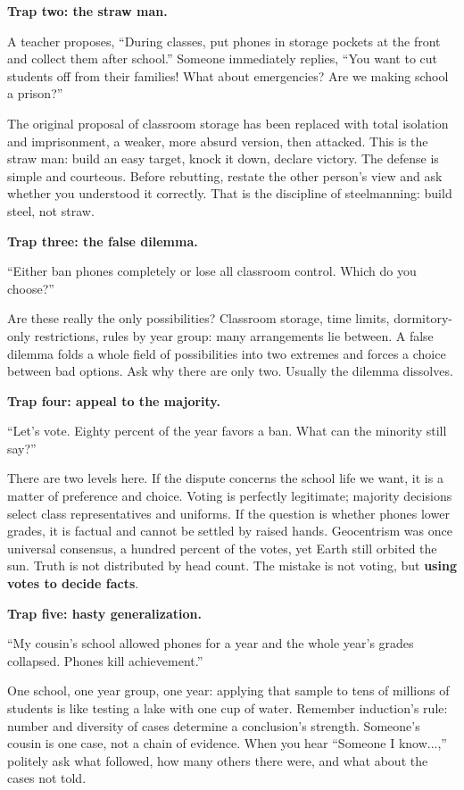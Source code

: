 \textbf{Trap two: the straw man.}

A teacher proposes, ``During classes, put phones in storage pockets at the front and collect them after school.'' Someone immediately replies, ``You want to cut students off from their families! What about emergencies? Are we making school a prison?''

The original proposal of classroom storage has been replaced with total isolation and imprisonment, a weaker, more absurd version, then attacked. This is the straw man: build an easy target, knock it down, declare victory. The defense is simple and courteous. Before rebutting, restate the other person's view and ask whether you understood it correctly. That is the discipline of steelmanning: build steel, not straw.

\textbf{Trap three: the false dilemma.}

``Either ban phones completely or lose all classroom control. Which do you choose?''

Are these really the only possibilities? Classroom storage, time limits, dormitory-only restrictions, rules by year group: many arrangements lie between. A false dilemma folds a whole field of possibilities into two extremes and forces a choice between bad options. Ask why there are only two. Usually the dilemma dissolves.

\textbf{Trap four: appeal to the majority.}

``Let's vote. Eighty percent of the year favors a ban. What can the minority still say?''

There are two levels here. If the dispute concerns the school life we want, it is a matter of preference and choice. Voting is perfectly legitimate; majority decisions select class representatives and uniforms. If the question is whether phones lower grades, it is factual and cannot be settled by raised hands. Geocentrism was once universal consensus, a hundred percent of the votes, yet Earth still orbited the sun. Truth is not distributed by head count. The mistake is not voting, but \textbf{using votes to decide facts}.

\textbf{Trap five: hasty generalization.}

``My cousin's school allowed phones for a year and the whole year's grades collapsed. Phones kill achievement.''

One school, one year group, one year: applying that sample to tens of millions of students is like testing a lake with one cup of water. Remember induction's rule: number and diversity of cases determine a conclusion's strength. Someone's cousin is one case, not a chain of evidence. When you hear ``Someone I know...,'' politely ask what followed, how many others there were, and what about the cases not told.

